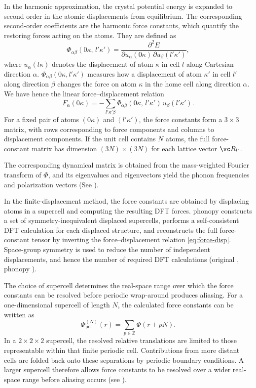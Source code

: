 In the harmonic approximation, the crystal potential energy is expanded
to second order in the atomic displacements from equilibrium.  The
corresponding second-order coefficients are the harmonic force constants,
which quantify the restoring forces acting on the atoms. They are defined as
\begin{equation}\label{eq:fc}
  \Phi_{\alpha\beta}(0\kappa,\, l'\kappa')
  = \frac{\partial^2 E}
         {\partial u_\alpha(0\kappa)\,\partial u_\beta(l'\kappa')},
\end{equation}
where $u_\alpha(l\kappa)$ denotes the displacement of atom $\kappa$ in cell
$l$ along Cartesian direction $\alpha$.
$\Phi_{\alpha\beta}(0\kappa,l'\kappa')$ measures how a displacement of atom
$\kappa'$ in cell $l'$ along direction $\beta$ changes the force on atom
$\kappa$ in the home cell along direction $\alpha$. We have hence the
linear force--displacement relation
\begin{equation}\label{eq:force-disp}
  F_\alpha(0\kappa)
  = - \sum_{l'\kappa'\beta}
      \Phi_{\alpha\beta}(0\kappa,\, l'\kappa')\,
      u_\beta(l'\kappa').
\end{equation}
For a fixed pair of atoms $(0\kappa)$ and $(l'\kappa')$, the force constants
form a $3\times 3$ matrix, with rows corresponding to force
components and columns to displacement components.  If the unit cell
contains $N$ atoms, the full force-constant matrix has dimension
$(3N)\times(3N)$ for each lattice vector $\vc R_{l'}$.

The corresponding dynamical matrix is obtained from the mass-weighted
Fourier transform of $\Phi$, and its eigenvalues and eigenvectors yield
the phonon frequencies and polarization vectors (See \cite{dove_introduction_1993}).

In the finite-displacement method, the force constants are
obtained by displacing atoms in a supercell and computing the resulting DFT forces.
phonopy constructs a set of symmetry-inequivalent displaced
supercells, performs a self-consistent DFT calculation for each displaced
structure, and reconstructs the full force-constant tensor by inverting the
force--displacement relation \cref{eq:force-disp}.
Space-group symmetry is used to reduce
the number of independent displacements, and hence the number of required
DFT calculations (original \cite{parlinski_first-principles_1997}, phonopy \cite{togo_first_2015}).

The choice of supercell determines the real-space range over which the force
constants can be resolved before periodic wrap-around produces aliasing.
For a one-dimensional supercell of length $N$, the calculated force constants
can be written as
\begin{equation}
  \Phi_{\mathrm{per}}^{(N)}(r)
  = \sum_{p\in\mathbb Z} \Phi(r+pN).
\end{equation}
In a $2\times2\times2$ supercell, the resolved relative translations are limited
to those representable within that finite periodic cell. Contributions from more
distant cells are folded back onto these separations by periodic boundary
conditions. A larger supercell therefore allows force constants to be resolved
over a wider real-space range before aliasing occurs (see \cite[Chs.~2,~6]{dove_introduction_1993}).

